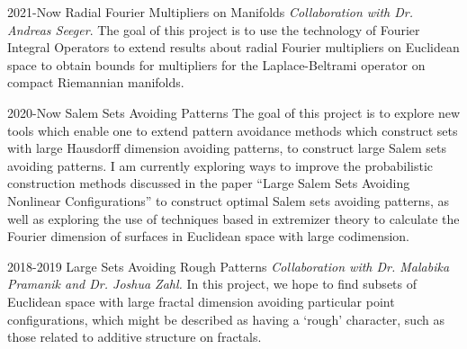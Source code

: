 \documentclass[a4paper]{cv-friggeri}
\begin{document}
\begin{entrylist}

\entry
{2021-Now}
{Radial Fourier Multipliers on Manifolds}
{}
{\emph{Collaboration with Dr. Andreas Seeger}. The goal of this project is to use the technology of Fourier Integral Operators to extend results about radial Fourier multipliers on Euclidean space to obtain bounds for multipliers for the Laplace-Beltrami operator on compact Riemannian manifolds.}



\entry
{2020-Now}
{Salem Sets Avoiding Patterns}
{}
{The goal of this project is to explore new tools which enable one to extend pattern avoidance methods which construct sets with large Hausdorff dimension avoiding patterns, to construct large Salem sets avoiding patterns. I am currently exploring ways to improve the probabilistic construction methods discussed in the paper ``Large Salem Sets Avoiding Nonlinear Configurations'' to construct optimal Salem sets avoiding patterns, as well as exploring the use of techniques based in extremizer theory to calculate the Fourier dimension of surfaces in Euclidean space with large codimension.}


\entry
{2018-2019}
{Large Sets Avoiding Rough Patterns}
{}
{\emph{Collaboration with Dr. Malabika Pramanik and Dr. Joshua Zahl.} In this project, we hope to find subsets of Euclidean space with large fractal dimension avoiding particular point configurations, which might be described as having a `rough' character, such as those related to additive structure on fractals.}




\end{entrylist}
\end{document}
